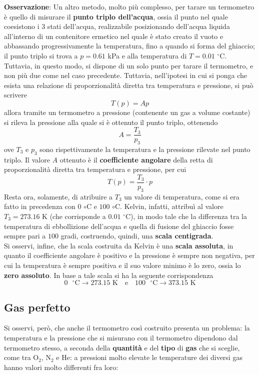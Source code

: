 \documentclass[a4paper]{extarticle}
\begin{document}
\vspace{1em}
\noindent
\textbf{Osservazione}: Un altro metodo, molto più complesso, per tarare un termometro è quello di misurare il \textbf{punto triplo dell'acqua}, ossia il punto nel quale coesistono i $3$ stati dell'acqua, realizzabile posizionando dell'acqua liquida all'interno di un contenitore ermetico nel quale è stato creato il vuoto e abbassando progressivamente la temperatura, fino a quando si forma del ghiaccio; il punto triplo si trova a $p=0.61$ kPa e alla temperatura di $T=0.01$ $^\circ$C.\\
Tuttavia, in questo modo, si dispone di un solo punto per tarare il termometro, e non più due come nel caso precedente. Tuttavia, nell'ipotesi in cui si ponga che esista una relazione di proporzionalità diretta tra temperatura e pressione, si può scrivere
\[T(p)=A p\]
allora tramite un termometro a pressione (contenente un gas a volume costante) si rileva la pressione alla quale si è ottenuto il punto triplo, ottenendo
\[A=\frac{T_3}{p_3}\]
ove $T_3$ e $p_3$ sono rispettivamente la temperatura e la pressione rilevate nel punto triplo. Il valore $A$ ottenuto è il \textbf{coefficiente angolare} della retta di proporzionalità diretta tra temperatura e pressione, per cui
\[\boxed{T(p)=\frac{T_3}{p_3} \cdot p}\]
Resta ora, solamente, di atribuire a $T_3$ un valore di temperatura, come si era fatto in precedenza con $0$ $\circ$C e $100$ $\circ$C. Kelvin, infatti, attribuì al valore $T_3=273.16$ K (che corrisponde a $0.01$ $^\circ$C), in modo tale che la differenza tra la temperatura di ebbollizione dell'acqua e quella di fusione del ghiaccio fosse sempre pari a $100$ gradi, costruendo, quindi, una \textbf{scala centigrada}.\\
Si osservi, infine, che la scala costruita da Kelvin è una \textbf{scala assoluta}, in quanto il coefficiente angolare è positivo e la pressione è sempre non negativa, per cui la temperatura è sempre positiva e il suo valore minimo è lo zero, ossia lo \textbf{zero assoluto}. In base a tale scala si ha la seguente corrispondenza
\[0 \text{ $^\circ$C} \longrightarrow 273.15 \text{ K} \hspace{1em} \text{e} \hspace{1em} 100 \text{ $^\circ$C} \longrightarrow 373.15 \text{ K}\]

\vspace{1em}
\noindent
\subsection{Gas perfetto}
Si osservi, però, che anche il termometro così costruito presenta un problema: la temperatura e la pressione che si misurano con il termometro dipendono dal termometro stesso, a seconda della \textbf{quantità} e del \textbf{tipo} di \textbf{gas} che si sceglie, come tra O$_2$, N$_2$ e He: a pressioni molto elevate le temperature dei diversi gas hanno valori molto differenti fra loro:
\end{document}
